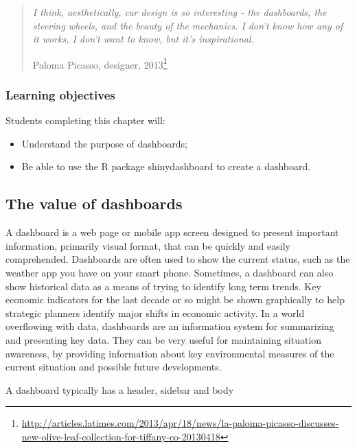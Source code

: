 \documentclass[
]{article}
\begin{document}
\begin{quote}
\emph{I think, aesthetically, car design is so interesting - the
dashboards, the steering wheels, and the beauty of the mechanics. I
don't know how any of it works, I don't want to know, but it's
inspirational.}

Paloma Picasso, designer, 2013\footnote{\url{http://articles.latimes.com/2013/apr/18/news/la-paloma-picasso-discusses-new-olive-leaf-collection-for-tiffany-co-20130418}}
\end{quote}

\hypertarget{learning-objectives-10}{%
\subsubsection*{Learning objectives}\label{learning-objectives-10}}

Students completing this chapter will:

\begin{itemize}
\item
  Understand the purpose of dashboards;
\item
  Be able to use the R package shinydashboard to create a dashboard.
\end{itemize}

\hypertarget{the-value-of-dashboards}{%
\subsection*{The value of dashboards}\label{the-value-of-dashboards}}

A dashboard is a web page or mobile app screen designed to present
important information, primarily visual format, that can be quickly and
easily comprehended. Dashboards are often used to show the current
status, such as the weather app you have on your smart phone. Sometimes,
a dashboard can also show historical data as a means of trying to
identify long term trends. Key economic indicators for the last decade
or so might be shown graphically to help strategic planners identify
major shifts in economic activity. In a world overflowing with data,
dashboards are an information system for summarizing and presenting key
data. They can be very useful for maintaining situation awareness, by
providing information about key environmental measures of the current
situation and possible future developments.

A dashboard typically has a header, sidebar and body
\end{document}
